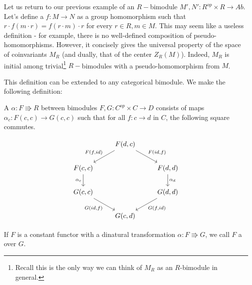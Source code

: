Let us return to our previous example of an $R-$bimodule $M',N':R^{op}\times R\rightarrow Ab$. Let's define a  $f:M\rightarrow N$ as a group homomorphism such that $r\cdot f(m\cdot r)=f(r\cdot m)\cdot r$ for every $r\in R, m\in M$. This may seem like a useless definition - for example, there is no well-defined composition of pseudo-homomorphisms. However, it concisely gives the universal property of the space of coinvariants $M_R$ (and dually, that of the center $Z_R(M)$). Indeed, $M_R$ is initial among trivial\footnote{Recall this is the only way we can think of $M_R$ as an $R$-bimodule in general.} $R-$bimodules with a pseudo-homomorphism from $M$.

This definition can be extended to any categorical bimodule. We make the following definition:
\begin{definition}
A  $\alpha:F\Rrightarrow R$ between bimodules $F,G:C^{op}\times C\rightarrow D$ consists of maps $\alpha_c:F(c,c)\rightarrow G(c,c)$ such that for all $f:c\rightarrow d$ in $C$, the following square commutes.

\[\begin{tikzcd}
                                  & {F(d,c)} \arrow[ld, "{F(f,id)}"'] \arrow[rd, "{F(id,f)}"] &                                  \\
{F(c,c)} \arrow[d, "\alpha_c"']   &                                                           & {F(d,d)} \arrow[d, "\alpha_d"]   \\
{G(c,c)} \arrow[rd, "{G(id,f)}"'] &                                                           & {G(d,d)} \arrow[ld, "{G(f,id)}"] \\
                                  & {G(c,d)}                                                  &                                 
\end{tikzcd}\]

If $F$ is a constant functor with a dinatural transformation $\alpha:F \Rrightarrow G$, we call $F$ a  over $G$.
\end{definition}

